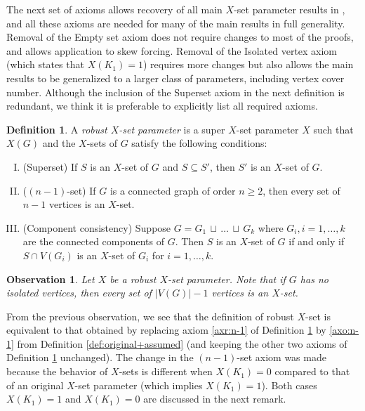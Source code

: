 \documentclass{article}
\numberwithin{figure}{section}
\numberwithin{table}{section}
\numberwithin{equation}{section}
\newtheorem{obs}[thm]{Observation}
\theoremstyle{definition}
\theoremstyle{definition}
\newtheorem{defn}[thm]{Definition}
\theoremstyle{definition}
\newcommand {\du} {\,\sqcup\,}
\newcommand{\ben}{\begin{enumerate}}
\newcommand{\een}{\end{enumerate}}
\newcommand{\Xr}{X}
\begin{document}
{ 


 
The next set of axioms allows recovery of all main $X$-set parameter results in \cite{PDrecon, XTARiso}, and all these axioms are needed for  many of the main results in full generality. Removal of the Empty set axiom does not  require changes to most of the proofs, and allows application to skew forcing.  Removal of the Isolated vertex axiom (which states that  $X(K_1) =1$) requires more changes but also allows the  main results to be  generalized to a larger class of parameters, including vertex cover number. Although the inclusion of the Superset axiom in the next definition is redundant, we think it is preferable to explicitly list all required axioms.

\begin{defn}\label{Robust-parameters-2}
A \emph{robust  $\Xr$-set parameter} is a super $X$-set parameter $X$  such that $X(G)$ and  the $X$-sets of $G$ satisfy the following conditions:  
\ben[(I)]
\item\label{axr:super}  (Superset)
If $S$ is an $\Xr$-set of  $G$ and  $S\subseteq S'$, then $S'$ is an $\Xr$-set of $G$.
\item\label{axr:n-1} ($(n-1)$-set) If $G$ is a connected graph of order  $n\ge 2$, then every set of $n-1$ vertices is an $\Xr$-set. 
\item\label{axr:component}
(Component consistency) Suppose $G = G_1\du \dots \du G_k$ where $G_i,i=1,\dots,k$ are the connected components of $G$.  Then $S$ is an $X$-set of $G$ if and only if $S\cap V(G_i)$ is an $X$-set of $G_i$ for $i=1,\dots,k$.\een  
\end{defn}

\begin{obs}\label{r:n-1-isol}
    Let $X$ be a robust $X$-set parameter. Note that if $G$ has no isolated vertices, then every set of $|V(G)|-1$ vertices is an $\Xr$-set.
\end{obs}

  From the previous observation, we see that the definition of robust $X$-set  is equivalent to that obtained by replacing axiom \eqref{axr:n-1} of Definition \ref{Robust-parameters-2} by \eqref{axo:n-1} from Definition \ref{def:original+assumed} (and keeping the other two axioms of Definition \ref{Robust-parameters-2} unchanged). The change in the $(n-1)$-set axiom was made because the behavior of $X$-sets  is different when $X(K_1)=0$ compared to that of  an original $X$-set parameter (which implies $X(K_1)=1$). %
 Both cases   $X(K_1)=1$ and $X(K_1)=0$ are discussed in the next remark.

}
\end{document}
